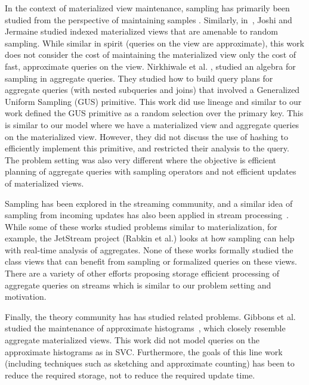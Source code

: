 In the context of materialized view maintenance, sampling has primarily been studied from the perspective of maintaining samples \cite{DBLP:conf/icde/OlkenR92}.
Similarly, in~\cite{joshi2008materialized}, Joshi and Jermaine studied indexed materialized views that are amenable to random sampling.
While similar in spirit (queries on the view are approximate), this work does not consider the cost of maintaining the materialized view only the cost of fast, approximate queries on the view.
Nirkhiwale et al. \cite{DBLP:journals/pvldb/NirkhiwaleDJ13}, studied an algebra for sampling in aggregate queries.
They studied how to build query plans for aggregate queries (with nested subqueries and joins) that involved a Generalized Uniform Sampling (GUS) primitive.
This work did use lineage and similar to our work defined the GUS primitive as a random selection over the primary key.
This is similar to our model where we have a materialized view and aggregate queries on the materialized view.
However, they did not discuss the use of hashing to efficiently implement this primitive, and restricted their analysis to the \sumfunc query.
The problem setting was also very different where the objective is efficient planning of aggregate queries with sampling operators and not efficient updates of materialized views.

Sampling has been explored in the streaming community, and a similar idea of sampling from incoming updates has also been applied in stream processing~\cite{tatbul2003load, Garofalakis, rabkin2014aggregation}.
While some of these works studied problems similar to materialization, for example, the JetStream project (Rabkin et al.) looks at how sampling can help with real-time analysis of aggregates.
None of these works formally studied the class views that can benefit from sampling or formalized queries on these views.
There are a variety of other efforts proposing storage efficient processing of aggregate queries on streams \cite{dobra2002processing, greenwald2001space} which is similar to our problem setting and motivation.

Finally, the theory community has has studied related problems.
Gibbons et al. studied the maintenance of approximate histograms~\cite{gibbons1997fast, DBLP:journals/ftdb/CormodeGHJ12}, which closely resemble aggregate materialized views.
This work did not model queries on the approximate histograms as in SVC.
Furthermore, the goals of this line work (including techniques such as sketching and approximate counting) has been to reduce the required storage, not to reduce the required update time.

